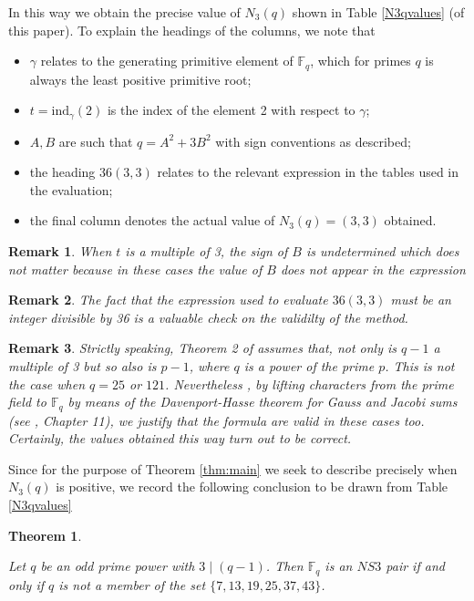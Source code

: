 \documentclass[12pt]{amsart}
\newtheorem{thm}{Theorem}[section]
\newtheorem{remark}{Remark}[section]
\numberwithin{equation}{section}
\newcommand{\F}{\mathbb{F}_q}
\begin{document}
In this way we obtain the precise value of $N_3(q)$ shown in Table \ref{N3qvalues} (of this paper).  To explain the headings of the columns, we note that 
\begin{itemize}
\item $\gamma$ relates to the generating primitive element of $\F$, which for primes $q$ is always the least positive primitive root;
\item $t = \text{ind}_\gamma(2)$ is the index of the element 2 with respect to $\gamma$;
\item $A,B$ are such that $q=A^2+3B^2$ with sign conventions as described;
\item the heading $36(3,3)$ relates to the relevant expression in the tables used in the evaluation;
\item the final column denotes the actual  value of $N_3(q)=(3,3)$ obtained.  
\end{itemize}
\begin{remark} 
\textnormal {When $t$ is a multiple of 3, the sign of $B$ is undetermined which does not matter because in these cases the value of $B$ does not appear in the expression}
 \end{remark}
 \begin{remark}
\textnormal {The fact that the expression used to evaluate  $36(3,3)$ must be an integer divisible by 36  is a valuable check on the validilty of the method.}
 \end{remark}
 \begin{remark}
\textnormal {Strictly speaking, Theorem 2 of \cite{AK1995} assumes that, not only is $q-1$ a multiple of 3 but so also is $p-1$, where $q$ is a power of the prime $p$.   This is not the case when $q=25$ or $121$. Nevertheless  , by lifting characters from the prime field to $\F$ by means of the  Davenport-Hasse theorem for Gauss and Jacobi sums  (see \cite{BEW1998}, Chapter 11), we justify  that the formula are valid in these cases too.  Certainly, the values obtained this way turn out to be correct.}
 \end{remark}
 
  Since for the purpose of Theorem \ref{thm:main} we seek to describe precisely when $N_3(q)$ is positive, we record the following conclusion to be drawn from Table \ref{N3qvalues}
\begin{thm}\label{N3conclus}

Let $q$ be an odd prime power with $3\mid(q-1)$.  Then $\mathbb F_q$ is
an $NS3$ pair if and only if $q$ is not a member of the set $\{7,13,19,25,37,43\}$.
\end{thm}
\end{document}

